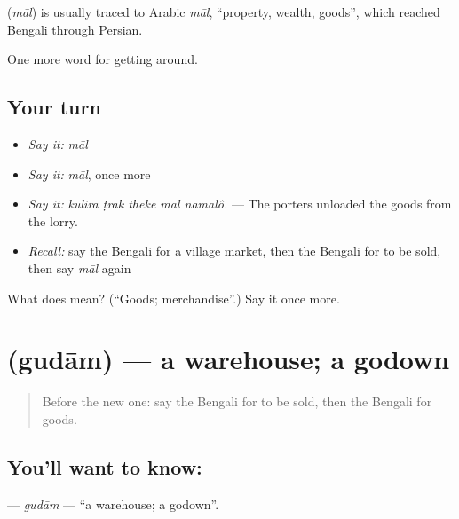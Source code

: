 \begin{cousinweb}
\textbf{} (\emph{māl}) is usually traced to Arabic \emph{māl}, \textquotedblleft{}property, wealth, goods\textquotedblright{}, which reached Bengali through Persian.
\end{cousinweb}

\begin{grammarlens}[title={What you've built}]
One more word for getting around.
\end{grammarlens}

\subsection*{Your turn}
\begin{itemize}
\raggedright
  \item \emph{Say it:} \emph{māl}
  \item \emph{Say it:} \emph{māl}, once more
  \item \emph{Say it:} \emph{kulirā ṭrāk theke māl nāmālô.} — The porters unloaded the goods from the lorry.
  \item \emph{Recall:} say the Bengali for a village market, then the Bengali for to be sold, then say \emph{māl} again
\end{itemize}

\begin{tcolorbox}[breakable,colback=teal!4,colframe=teal!35!black,title={Before you move on}]
What does  mean? (\textquotedblleft{}Goods; merchandise\textquotedblright{}.) Say it once more.
\end{tcolorbox}
\section[\texorpdfstring{\bn{গুদাম} (gudām)}{গুদাম (gudām)}]{ (gudām) — a warehouse; a godown}

\label{lesson:BN-C421-gudam}



\begin{quote}
Before the new one: say the Bengali for to be sold, then the Bengali for goods.
\end{quote}

\subsection*{You'll want to know: }
\textbf{} — \emph{gudām} — \textquotedblleft{}a warehouse; a godown\textquotedblright{}.

